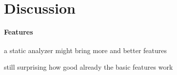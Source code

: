 \section{Discussion}

\paragraph*{Features}
a static analyzer might bring more and better features

still surprising how good already the basic features work
